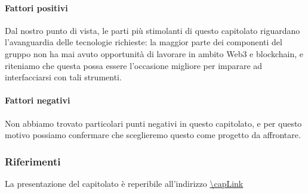 \paragraph{Fattori positivi}

Dal nostro punto di vista, le parti più stimolanti di questo capitolato riguardano l'avanguardia delle tecnologie richieste: la maggior parte dei componenti del gruppo non ha mai avuto opportunità di lavorare in ambito Web3 e blockchain, e riteniamo che questa possa essere l'occasione migliore per imparare ad interfacciarsi con tali strumenti.

\paragraph{Fattori negativi}

Non abbiamo trovato particolari punti negativi in questo capitolato, e per questo motivo possiamo confermare che sceglieremo questo come progetto da affrontare.
\subsubsection{Riferimenti}
La presentazione del capitolato è reperibile all'indirizzo \url{\capLink} \hfill{}